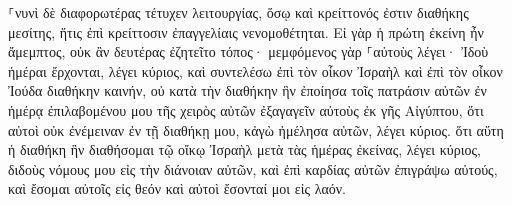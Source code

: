 \documentclass{openreader}
\begin{document}
⸀νυνὶ δὲ διαφορωτέρας τέτυχεν λειτουργίας, ὅσῳ καὶ κρείττονός ἐστιν διαθήκης μεσίτης, ἥτις ἐπὶ κρείττοσιν ἐπαγγελίαις νενομοθέτηται. 
Εἰ γὰρ ἡ πρώτη ἐκείνη ἦν ἄμεμπτος, οὐκ ἂν δευτέρας ἐζητεῖτο τόπος· 
μεμφόμενος γὰρ ⸀αὐτοὺς λέγει· Ἰδοὺ ἡμέραι ἔρχονται, λέγει κύριος, καὶ συντελέσω ἐπὶ τὸν οἶκον Ἰσραὴλ καὶ ἐπὶ τὸν οἶκον Ἰούδα διαθήκην καινήν, 
οὐ κατὰ τὴν διαθήκην ἣν ἐποίησα τοῖς πατράσιν αὐτῶν ἐν ἡμέρᾳ ἐπιλαβομένου μου τῆς χειρὸς αὐτῶν ἐξαγαγεῖν αὐτοὺς ἐκ γῆς Αἰγύπτου, ὅτι αὐτοὶ οὐκ ἐνέμειναν ἐν τῇ διαθήκῃ μου, κἀγὼ ἠμέλησα αὐτῶν, λέγει κύριος. 
ὅτι αὕτη ἡ διαθήκη ἣν διαθήσομαι τῷ οἴκῳ Ἰσραὴλ μετὰ τὰς ἡμέρας ἐκείνας, λέγει κύριος, διδοὺς νόμους μου εἰς τὴν διάνοιαν αὐτῶν, καὶ ἐπὶ καρδίας αὐτῶν ἐπιγράψω αὐτούς, καὶ ἔσομαι αὐτοῖς εἰς θεόν καὶ αὐτοὶ ἔσονταί μοι εἰς λαόν. 
\end{document}
